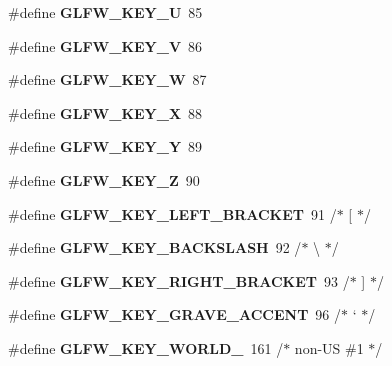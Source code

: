 \begin{DoxyCompactItemize}
\#define {\bfseries G\+L\+F\+W\+\_\+\+K\+E\+Y\+\_\+U}~85
\item 
\mbox{\label{group__keys_ga22c7763899ecf7788862e5f90eacce6b}} 
\#define {\bfseries G\+L\+F\+W\+\_\+\+K\+E\+Y\+\_\+V}~86
\item 
\mbox{\label{group__keys_gaa06a712e6202661fc03da5bdb7b6e545}} 
\#define {\bfseries G\+L\+F\+W\+\_\+\+K\+E\+Y\+\_\+W}~87
\item 
\mbox{\label{group__keys_gac1c42c0bf4192cea713c55598b06b744}} 
\#define {\bfseries G\+L\+F\+W\+\_\+\+K\+E\+Y\+\_\+X}~88
\item 
\mbox{\label{group__keys_gafd9f115a549effdf8e372a787c360313}} 
\#define {\bfseries G\+L\+F\+W\+\_\+\+K\+E\+Y\+\_\+Y}~89
\item 
\mbox{\label{group__keys_gac489e208c26afda8d4938ed88718760a}} 
\#define {\bfseries G\+L\+F\+W\+\_\+\+K\+E\+Y\+\_\+Z}~90
\item 
\mbox{\label{group__keys_gad1c8d9adac53925276ecb1d592511d8a}} 
\#define {\bfseries G\+L\+F\+W\+\_\+\+K\+E\+Y\+\_\+\+L\+E\+F\+T\+\_\+\+B\+R\+A\+C\+K\+ET}~91  /$\ast$ \mbox{[} $\ast$/
\item 
\mbox{\label{group__keys_gab8155ea99d1ab27ff56f24f8dc73f8d1}} 
\#define {\bfseries G\+L\+F\+W\+\_\+\+K\+E\+Y\+\_\+\+B\+A\+C\+K\+S\+L\+A\+SH}~92  /$\ast$ \textbackslash{} $\ast$/
\item 
\mbox{\label{group__keys_ga86ef225fd6a66404caae71044cdd58d8}} 
\#define {\bfseries G\+L\+F\+W\+\_\+\+K\+E\+Y\+\_\+\+R\+I\+G\+H\+T\+\_\+\+B\+R\+A\+C\+K\+ET}~93  /$\ast$ \mbox{]} $\ast$/
\item 
\mbox{\label{group__keys_ga7a3701fb4e2a0b136ff4b568c3c8d668}} 
\#define {\bfseries G\+L\+F\+W\+\_\+\+K\+E\+Y\+\_\+\+G\+R\+A\+V\+E\+\_\+\+A\+C\+C\+E\+NT}~96  /$\ast$ ` $\ast$/
\item 
\mbox{\label{group__keys_gadc78dad3dab76bcd4b5c20114052577a}} 
\#define {\bfseries G\+L\+F\+W\+\_\+\+K\+E\+Y\+\_\+\+W\+O\+R\+L\+D\+\_}~161 /$\ast$ non-\/US \#1 $\ast$/

\end{DoxyCompactItemize}
